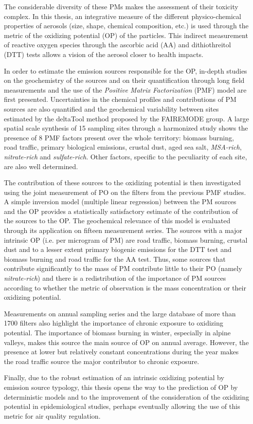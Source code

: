 The considerable diversity of these PMs makes the assessment of their toxicity complex.
In this thesis, an integrative measure of the different physico-chemical properties of
aerosols (size, shape, chemical composition, etc.) is used through the metric of the
oxidizing potential (OP) of the particles. This indirect measurement of reactive oxygen
species through the ascorbic acid (AA) and dithiothreitol (DTT) tests allows a vision of
the aerosol closer to health impacts.

In order to estimate the emission sources responsible for the OP, in-depth studies on the
geochemistry of the sources and on their quantification through long field measurements
and the use of the \textit{Positive Matrix Factorization} (PMF) model are first
presented.  Uncertainties in the chemical profiles and contributions of PM sources are
also quantified and the geochemical variability between sites estimated by the deltaTool
method proposed by the FAIREMODE group.  A large spatial scale synthesis of 15 sampling
sites through a harmonized study shows the presence of 8 PMF factors present over the
whole territory: biomass burning, road traffic, primary biological emissions,
crustal dust, aged sea salt, \textit{MSA-rich}, \textit{nitrate-rich} and
\textit{sulfate-rich}. Other factors, specific to the peculiarity of each site, are also
well determined.

The contribution of these sources to the oxidizing potential is then investigated using
the joint measurement of PO on the filters from the previous PMF studies. A simple
inversion model (multiple linear regression) between the PM sources and the OP provides a
statistically satisfactory estimate of the contribution of the sources to the OP. The
geochemical relevance of this model is evaluated through its application on fifteen
measurement series. The sources with a major intrinsic OP (i.e. per
microgram of PM) are road traffic, biomass burning, crustal dust and to a lesser
extent primary biogenic emissions for the DTT test and biomass burning and road
traffic for the AA test. Thus, some sources that contribute significantly to the mass of
PM contribute little to their PO (namely \textit{nitrate-rich}) and there is a
redistribution of the importance of PM sources according to whether the metric of
observation is the mass concentration or their oxidizing potential.

Measurements on annual sampling series and the large database of more than 1700 filters
also highlight the importance of chronic exposure to oxidizing potential. The importance
of biomass burning in winter, especially in alpine valleys, makes this source the main
source of OP on annual average. However, the presence at lower but relatively constant
concentrations during the year makes the road traffic source the major contributor to
chronic exposure.

Finally, due to the robust estimation of an intrinsic oxidizing potential by emission
source typology, this thesis opens the way to the prediction of OP by deterministic
models and to the improvement of the consideration of the oxidizing potential in
epidemiological studies, perhaps eventually allowing the use of this metric for air
quality regulation.

